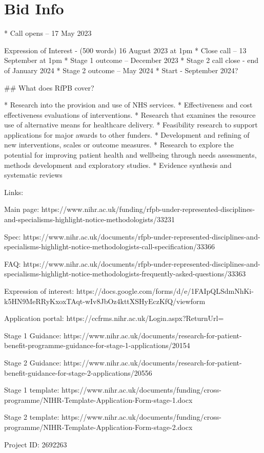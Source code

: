 \section{Bid Info}


\begin{markdown}

* Call opens – 17 May 2023    \item Expression of Interest - (500 words) 16 August 2023 at 1pm
* Close call – 13 September at 1pm
* Stage 1 outcome – December 2023
* Stage 2 call close - end of January 2024
* Stage 2 outcome – May 2024
* Start - September 2024?

## What does RfPB cover?

* Research into the provision and use of NHS services.
* Effectiveness and cost effectiveness evaluations of interventions.
* Research that examines the resource use of alternative means for healthcare delivery.
* Feasibility research to support applications for major awards to other funders.
* Development and refining of new interventions, scales or outcome measures.
*  Research to explore the potential for improving patient health and wellbeing through needs assessments, methods development and exploratory studies.
* Evidence synthesis and systematic reviews


Links:

Main page: https://www.nihr.ac.uk/funding/rfpb-under-represented-disciplines-and-specialisms-highlight-notice-methodologists/33231

Spec: https://www.nihr.ac.uk/documents/rfpb-under-represented-disciplines-and-specialisms-highlight-notice-methodologists-call-specification/33366

FAQ: https://www.nihr.ac.uk/documents/rfpb-under-represented-disciplines-and-specialisms-highlight-notice-methodologists-frequently-asked-questions/33363

Expression of interest: https://docs.google.com/forms/d/e/1FAIpQLSdmNhKi-k5HN9MeRRyKxoxTAqt-wIv8JbOz4kttXSHyEczKfQ/viewform

Application portal: https://ccfrms.nihr.ac.uk/Login.aspx?ReturnUrl=%

Stage 1 Guidance: https://www.nihr.ac.uk/documents/research-for-patient-benefit-programme-guidance-for-stage-1-applications/20154

Stage 2 Guidance: https://www.nihr.ac.uk/documents/research-for-patient-benefit-guidance-for-stage-2-applications/20556

Stage 1 template: https://www.nihr.ac.uk/documents/funding/cross-programme/NIHR-Template-Application-Form-stage-1.docx

Stage 2 template: https://www.nihr.ac.uk/documents/funding/cross-programme/NIHR-Template-Application-Form-stage-2.docx


\end{markdown}

Project ID: 2692263
